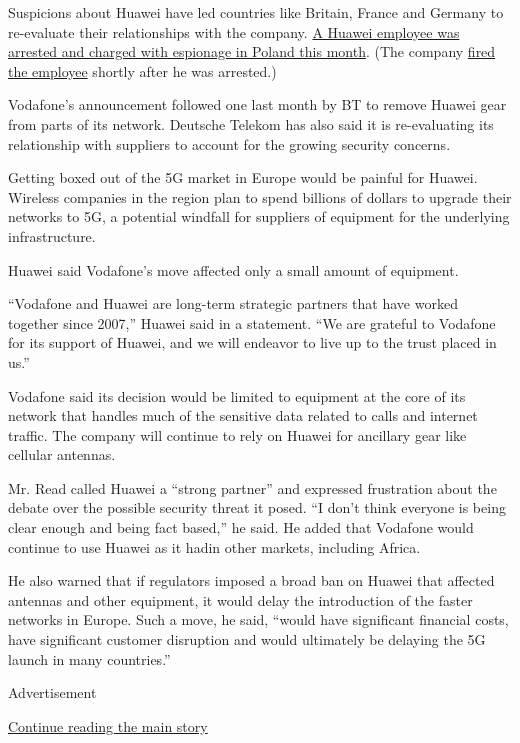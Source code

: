 Suspicions about Huawei have led countries like Britain, France and
Germany to re-evaluate their relationships with the company.
\href{https://www.nytimes.com/2019/01/11/world/europe/poland-china-huawei-spy.html}{A
Huawei employee was arrested and charged with espionage in Poland this
month}. (The company
\href{https://www.nytimes.com/2019/01/12/world/asia/huawei-wang-weijing-poland.html}{fired
the employee} shortly after he was arrested.)

Vodafone's announcement followed one last month by BT to remove Huawei
gear from parts of its network. Deutsche Telekom has also said it is
re-evaluating its relationship with suppliers to account for the growing
security concerns.

Getting boxed out of the 5G market in Europe would be painful for
Huawei. Wireless companies in the region plan to spend billions of
dollars to upgrade their networks to 5G, a potential windfall for
suppliers of equipment for the underlying infrastructure.

Huawei said Vodafone's move affected only a small amount of equipment.

``Vodafone and Huawei are long-term strategic partners that have worked
together since 2007,'' Huawei said in a statement. ``We are grateful to
Vodafone for its support of Huawei, and we will endeavor to live up to
the trust placed in us.''

Vodafone said its decision would be limited to equipment at the core of
its network that handles much of the sensitive data related to calls and
internet traffic. The company will continue to rely on Huawei for
ancillary gear like cellular antennas.

Mr. Read called Huawei a ``strong partner'' and expressed frustration
about the debate over the possible security threat it posed. ``I don't
think everyone is being clear enough and being fact based,'' he said. He
added that Vodafone would continue to use Huawei as it hadin other
markets, including Africa.

He also warned that if regulators imposed a broad ban on Huawei that
affected antennas and other equipment, it would delay the introduction
of the faster networks in Europe. Such a move, he said, ``would have
significant financial costs, have significant customer disruption and
would ultimately be delaying the 5G launch in many countries.''

Advertisement

\protect\hyperlink{after-bottom}{Continue reading the main story}

